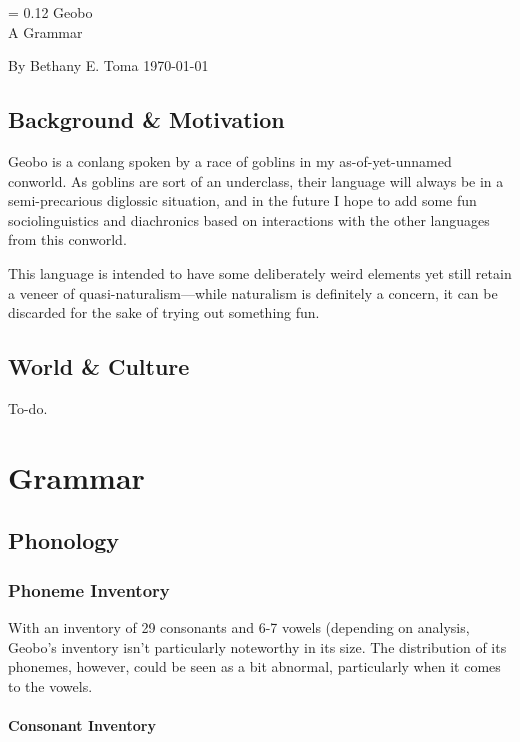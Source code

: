 \documentclass[a4paper,11pt,oneside,openany]{memoir}
\newlength{\drop}%
\newcommand*{\titleP}{\begingroup%
\drop = 0.12\textheight
\vspace*{\drop}
\hspace*{0.3\textwidth}
{\HUGE\sc Geobo\engma}\\[\baselineskip]
\hspace*{0.33\textwidth}
{\huge A Grammar}\par
\vspace*{3\drop}
{\large By {\sc Bethany E. Toma}}
\vfill
{\today}
\vspace*{0.5\drop}
\endgroup}
\begin{document}
\begin{titlingpage}
\titleP
\end{titlingpage}
\frontmatter

\pagestyle{headings}

\chapter{Background \& Motivation}

Geobo{\engma} is a conlang spoken by a race of goblins in my as-of-yet-unnamed conworld. As goblins are sort of an underclass, their language will always be in a semi-precarious diglossic situation, and in the future I hope to add some fun sociolinguistics and diachronics based on interactions with the other languages from this conworld.

This language is intended to have some deliberately weird elements yet still retain a veneer of quasi-naturalism---while naturalism is definitely a concern, it can be discarded for the sake of trying out something fun.

\clearpage
\tableofcontents

\chapter{World \& Culture}

To-do.

\mainmatter

\part{Grammar}

\chapter{Phonology}

\section{Phoneme Inventory}

With an inventory of 29 consonants and 6-7 vowels (depending on analysis, Geobo\engma's inventory isn't particularly noteworthy in its size. The distribution of its phonemes, however, could be seen as a bit abnormal, particularly when it comes to the vowels.

\subsection{Consonant Inventory}
\end{document}
